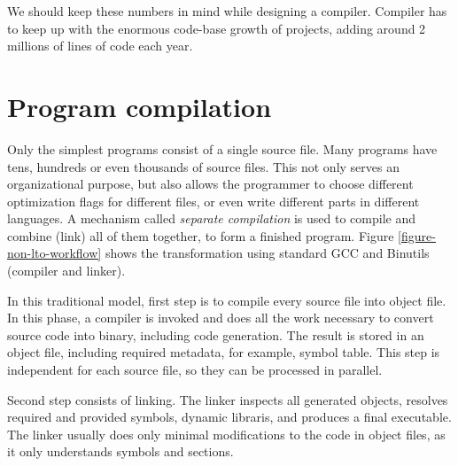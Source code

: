 We should keep these numbers in mind while designing a compiler. Compiler has
to keep up with the enormous code-base growth of projects, adding around 2
millions of lines of code each year.

\section{Program compilation}

Only the simplest programs consist of a single source file. Many programs have
tens, hundreds or even thousands of source files. This not only serves an
organizational purpose, but also allows the programmer to choose different
optimization flags for different files, or even write different parts in
different languages. A mechanism called {\sl separate compilation} is used to
compile and combine (link) all of them together, to form a finished program.
Figure \ref{figure-non-lto-workflow} shows the transformation using standard GCC
and Binutils (compiler and linker).

In this traditional model, first step is to compile every  source file into
object file. In this phase, a compiler is invoked and does all the work
necessary to convert source code into binary, including code generation. The
result is stored in an object file, including required metadata, for example,
symbol table. This step is independent for each source file, so they can be
processed in parallel. 

Second step consists of linking. The linker inspects all generated objects,
resolves required and provided symbols, dynamic libraris, and produces a
final executable. The linker usually does only minimal modifications to the code
in object files, as it only understands symbols and sections.

